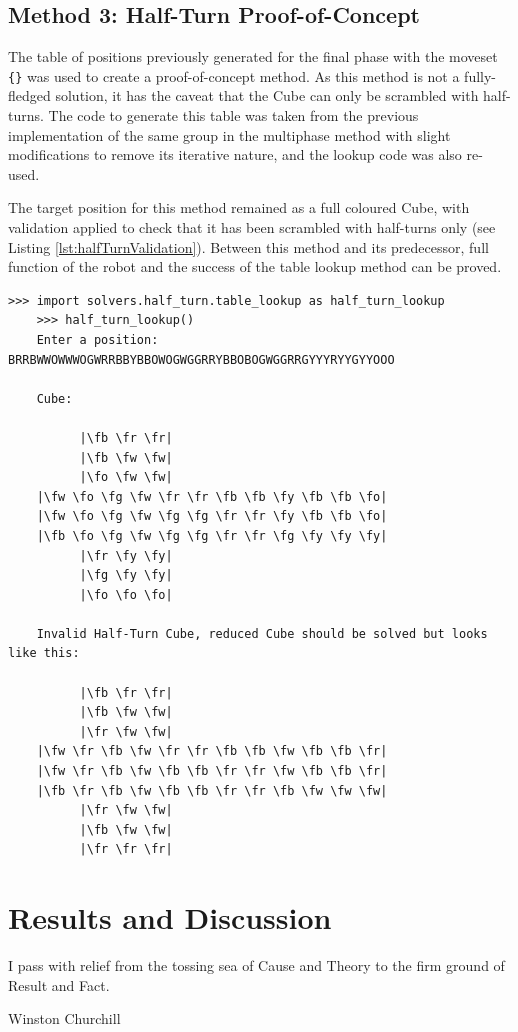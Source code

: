 \documentclass{report}
\newcommand{\moveset}[1]{\uppercase{\texttt{\{\formatmoves{#1}\}}}}
\newcommand{\fw}{\color{gray}W }
\newcommand{\fo}{\color{orange}O }
\newcommand{\fg}{\color{green}G }
\newcommand{\fr}{\color{red}R }
\newcommand{\fb}{\color{blue}B }
\newcommand{\fy}{\color{yellow}Y }
\begin{document}
	\section{Method 3: Half-Turn Proof-of-Concept} \label{sec:halfTurnSolving}
	
	The table of positions previously generated for the final phase with the moveset \moveset{u2d2l2r2f2b"} was used to create a proof-of-concept method. As this method is not a fully-fledged solution, it has the caveat that the Cube can only be scrambled with half-turns. The code to generate this table was taken from the previous implementation of the same group in the multiphase method with slight modifications to remove its iterative nature, and the lookup code was also re-used.
	
	The target position for this method remained as a full coloured Cube, with validation applied to check that it has been scrambled with half-turns only (see Listing \ref{lst:halfTurnValidation}). Between this method and its predecessor, full function of the robot and the success of the table lookup method can be proved.	
	
	\begin{lstlisting}[caption={Half-Turn method validation}, label={lst:halfTurnValidation}]
	>>> import solvers.half_turn.table_lookup as half_turn_lookup
	>>> half_turn_lookup()
	Enter a position: BRRBWWOWWWOGWRRBBYBBOWOGWGGRRYBBOBOGWGGRRGYYYRYYGYYOOO
	
	Cube:
	
	      |\fb \fr \fr|
	      |\fb \fw \fw|
	      |\fo \fw \fw|
	|\fw \fo \fg \fw \fr \fr \fb \fb \fy \fb \fb \fo|
	|\fw \fo \fg \fw \fg \fg \fr \fr \fy \fb \fb \fo|
	|\fb \fo \fg \fw \fg \fg \fr \fr \fg \fy \fy \fy|
	      |\fr \fy \fy|
	      |\fg \fy \fy|
	      |\fo \fo \fo|
	      
	Invalid Half-Turn Cube, reduced Cube should be solved but looks like this:
	
	      |\fb \fr \fr|
	      |\fb \fw \fw|
	      |\fr \fw \fw|
	|\fw \fr \fb \fw \fr \fr \fb \fb \fw \fb \fb \fr|
	|\fw \fr \fb \fw \fb \fb \fr \fr \fw \fb \fb \fr|
	|\fb \fr \fb \fw \fb \fb \fr \fr \fb \fw \fw \fw|
	      |\fr \fw \fw|
	      |\fb \fw \fw|
	      |\fr \fr \fr|\end{lstlisting}
	
    \newpage
    \chapter{Results and Discussion} \label{chp:resultsDiscussion}
   	\epigraph{I pass with relief from the tossing sea of Cause and Theory to the firm ground of Result and Fact.}{Winston Churchill \cite{Churchill1898}}
    
\end{document}
